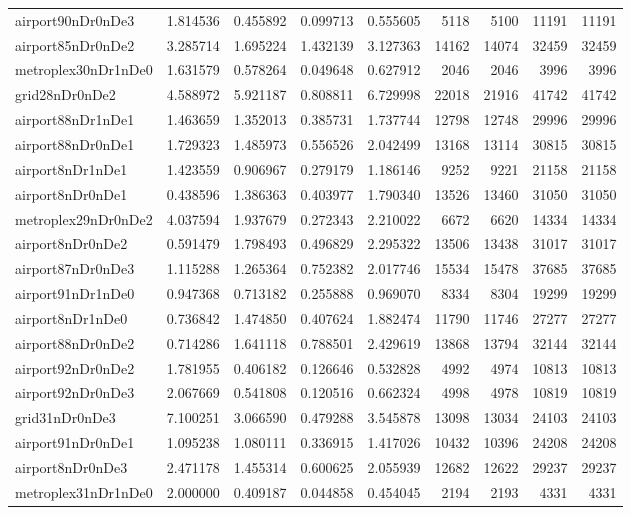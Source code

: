 \begin{longtable}{|l|r|r|r|r|r|r|r|r|}
airport90nDr0nDe3 & 1.814536 & 0.455892 & 0.099713 & 0.555605 & 5118 & 5100 & 11191 & 11191 \\
airport85nDr0nDe2 & 3.285714 & 1.695224 & 1.432139 & 3.127363 & 14162 & 14074 & 32459 & 32459 \\
metroplex30nDr1nDe0 & 1.631579 & 0.578264 & 0.049648 & 0.627912 & 2046 & 2046 & 3996 & 3996 \\
grid28nDr0nDe2 & 4.588972 & 5.921187 & 0.808811 & 6.729998 & 22018 & 21916 & 41742 & 41742 \\
airport88nDr1nDe1 & 1.463659 & 1.352013 & 0.385731 & 1.737744 & 12798 & 12748 & 29996 & 29996 \\
airport88nDr0nDe1 & 1.729323 & 1.485973 & 0.556526 & 2.042499 & 13168 & 13114 & 30815 & 30815 \\
airport8nDr1nDe1 & 1.423559 & 0.906967 & 0.279179 & 1.186146 & 9252 & 9221 & 21158 & 21158 \\
airport8nDr0nDe1 & 0.438596 & 1.386363 & 0.403977 & 1.790340 & 13526 & 13460 & 31050 & 31050 \\
metroplex29nDr0nDe2 & 4.037594 & 1.937679 & 0.272343 & 2.210022 & 6672 & 6620 & 14334 & 14334 \\
airport8nDr0nDe2 & 0.591479 & 1.798493 & 0.496829 & 2.295322 & 13506 & 13438 & 31017 & 31017 \\
airport87nDr0nDe3 & 1.115288 & 1.265364 & 0.752382 & 2.017746 & 15534 & 15478 & 37685 & 37685 \\
airport91nDr1nDe0 & 0.947368 & 0.713182 & 0.255888 & 0.969070 & 8334 & 8304 & 19299 & 19299 \\
airport8nDr1nDe0 & 0.736842 & 1.474850 & 0.407624 & 1.882474 & 11790 & 11746 & 27277 & 27277 \\
airport88nDr0nDe2 & 0.714286 & 1.641118 & 0.788501 & 2.429619 & 13868 & 13794 & 32144 & 32144 \\
airport92nDr0nDe2 & 1.781955 & 0.406182 & 0.126646 & 0.532828 & 4992 & 4974 & 10813 & 10813 \\
airport92nDr0nDe3 & 2.067669 & 0.541808 & 0.120516 & 0.662324 & 4998 & 4978 & 10819 & 10819 \\
grid31nDr0nDe3 & 7.100251 & 3.066590 & 0.479288 & 3.545878 & 13098 & 13034 & 24103 & 24103 \\
airport91nDr0nDe1 & 1.095238 & 1.080111 & 0.336915 & 1.417026 & 10432 & 10396 & 24208 & 24208 \\
airport8nDr0nDe3 & 2.471178 & 1.455314 & 0.600625 & 2.055939 & 12682 & 12622 & 29237 & 29237 \\
metroplex31nDr1nDe0 & 2.000000 & 0.409187 & 0.044858 & 0.454045 & 2194 & 2193 & 4331 & 4331 \\

\end{longtable}
